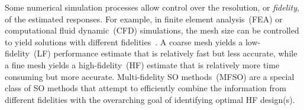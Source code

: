 

Some numerical simulation processes allow control over the resolution, or \emph{fidelity}, of the estimated responses. For example, in finite element analysis~(FEA) or computational fluid dynamic~(CFD) simulations, the mesh size can be controlled to yield solutions with different fidelities~\cite{branke2016efficient,toal2015some}. A coarse mesh yields a low-fidelity~(LF) performance estimate that is relatively fast but less accurate, while a fine mesh yields a high-fidelity~(HF) estimate that is relatively more time consuming but more accurate. Multi-fidelity SO methods~(MFSO) are a special class of SO methods that attempt to efficiently combine the information from different fidelities with the overarching goal of identifying optimal HF design(s). 

% 


